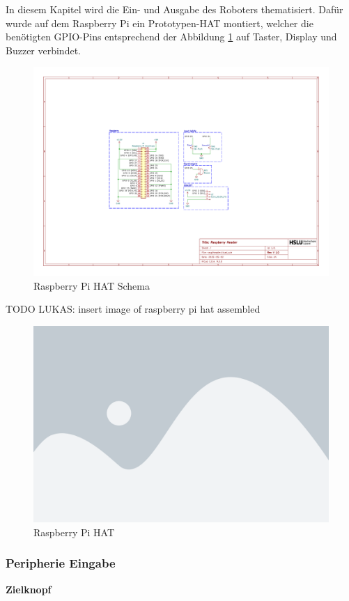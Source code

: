 In diesem Kapitel wird die Ein- und Ausgabe des Roboters thematisiert.
Dafür wurde auf dem Raspberry Pi ein Prototypen-HAT montiert, welcher die benötigten GPIO-Pins entsprechend der Abbildung \ref{fig:raspiheader-schema} auf Taster, Display und Buzzer verbindet.

\begin{figure}[H]
    \centering
    \includegraphics[width=\linewidth, trim=7.5cm 6cm 10cm 6cm, clip]{assets/ET/PCB/raspiheader.pdf}
    \caption{Raspberry Pi HAT Schema}
    \label{fig:raspiheader-schema}
\end{figure}

TODO LUKAS: insert image of raspberry pi hat assembled
\begin{figure}[H]
    \centering
    \includegraphics[width=0.5\linewidth]{assets/placeholder.png}
    \caption{Raspberry Pi HAT}
    \label{fig:raspiheader-assembly}
\end{figure}

\subsubsection{Peripherie Eingabe}
\label{zieleingabe}

\textbf{Zielknopf}


